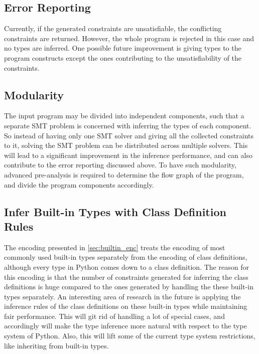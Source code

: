 \subsection{Error Reporting}
Currently, if the generated constraints are unsatisfiable, the conflicting constraints are returned. However, the whole program is rejected in this case and no types are inferred. One possible future improvement is giving types to the program constructs except the ones contributing to the unsatisfiability of the constraints.
\subsection{Modularity}
The input program may be divided into independent components, such that a separate SMT problem is concerned with inferring the types of each component. So instead of having only one SMT solver and giving all the collected constraints to it, solving the SMT problem can be distributed across multiple solvers. This will lead to a significant improvement in the inference performance, and can also contribute to the error reporting discussed above. To have such modularity, advanced pre-analysis is required to determine the flow graph of the program, and divide the program components accordingly.
\subsection{Infer Built-in Types with Class Definition Rules}
The encoding presented in \ref{sec:builtin_enc} treats the encoding of most commonly used built-in types separately from the encoding of class definitions, although every type in Python comes down to a class definition. The reason for this encoding is that the number of constraints generated for inferring the class definitions is huge compared to the ones generated by handling the these built-in types separately. An interesting area of research in the future is applying the inference rules of the class definitions on these built-in types while maintaining fair performance. This will git rid of handling a lot of special cases, and accordingly will make the type inference more natural with respect to the type system of Python. Also, this will lift some of the current type system restrictions, like inheriting from built-in types.
